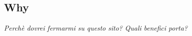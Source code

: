 \subsection{Why}
\begin{center}

\textit{Perchè dovrei fermarmi su questo sito? Quali benefici porta?}

\end{center}